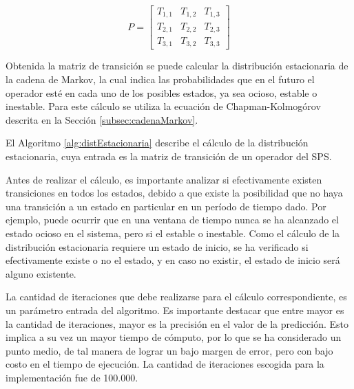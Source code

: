 \begin{equation} \label{eq:matrizTransicionPredictive}
	P =
	\begin{bmatrix}
		T_{1,1} & T_{1,2} & T_{1,3} \\
		T_{2,1} & T_{2,2} & T_{2,3} \\
		T_{3,1} & T_{3,2} & T_{3,3}
	\end{bmatrix}	
\end{equation}

Obtenida la matriz de transición se puede calcular la distribución estacionaria de la cadena de Markov, la cual indica las probabilidades que en el futuro el operador esté en cada uno de los posibles estados, ya sea ocioso, estable o inestable. Para este cálculo se utiliza la ecuación de Chapman-Kolmogórov \citep{Papoulis1984} descrita en la Sección \ref{subsec:cadenaMarkov}.

El Algoritmo \ref{alg:distEstacionaria} describe el cálculo de la distribución estacionaria, cuya entrada es la matriz de transición de un operador del SPS. 

Antes de realizar el cálculo, es importante analizar si efectivamente existen transiciones en todos los estados, debido a que existe la posibilidad que no haya una transición a un estado en particular en un período de tiempo dado. Por ejemplo, puede ocurrir que en una ventana de tiempo nunca se ha alcanzado el estado ocioso en el sistema, pero si el estable o inestable. Como el cálculo de la distribución estacionaria requiere un estado de inicio, se ha verificado si efectivamente existe o no el estado, y en caso no existir, el estado de inicio será alguno existente.

La cantidad de iteraciones que debe realizarse para el cálculo correspondiente, es un parámetro entrada del algoritmo. Es importante destacar que entre mayor es la cantidad de iteraciones, mayor es la precisión en el valor de la predicción. Esto implica a su vez un mayor tiempo de cómputo, por lo que se ha considerado un punto medio, de tal manera de lograr un bajo margen de error, pero con bajo costo en el tiempo de ejecución. La cantidad de iteraciones escogida para la implementación fue de 100.000.

